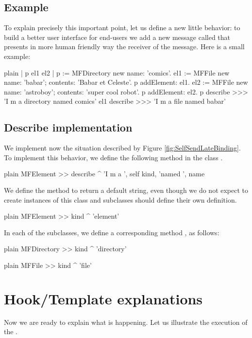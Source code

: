 \documentclass[10pt,twoside,english]{_support/latex/sbabook/sbabook}
\begin{document}
\subsection{Example}
To explain precisely this important point, let us define a new little behavior: to build a better user interface for end-users we add a new message called  that presents in more human friendly way the receiver of the message.
Here is a small example: 

\begin{displaycode}{plain}
| p el1 el2 |
p := MFDirectory new name: 'comics'.
el1 := MFFile new name: 'babar'; contents: 'Babar et Celeste'.
p addElement: el1.
el2 := MFFile new name: 'astroboy'; contents: 'super cool robot'.
p addElement: el2.
p describe
>>> 'I m a directory named comics'
el1 describe
>>> 'I m a file named babar'
\end{displaycode}
\subsection{Describe implementation }
We implement now the situation described by Figure \ref{fig:SelfSendLateBinding}.
To implement this behavior, we define the following method  in the class .

\begin{displaycode}{plain}
MFElement >> describe
	^ 'I m a ', self kind, 'named ', name  
\end{displaycode}

We define the method  to return a default string, even though we do not expect 
to create instances of this class and subclasses should define their own definition.

\begin{displaycode}{plain}
MFElement >> kind
	^ 'element'
\end{displaycode}

In each of the subclasses, we define a corresponding method , as follows: 

\begin{displaycode}{plain}
MFDirectory >> kind
	^ 'directory'
\end{displaycode}

\begin{displaycode}{plain}
MFFile >> kind
	^ 'file'
\end{displaycode}
\section{Hook/Template explanations}
Now we are ready to explain what is happening. Let us illustrate the execution of the .
\end{document}
